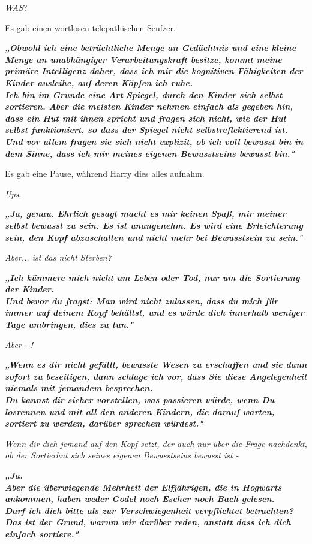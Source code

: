 {\emph{WAS}?

Es gab einen wortlosen telepathischen Seufzer.

\textbf{\emph{„Obwohl ich eine beträchtliche Menge an Gedächtnis und eine kleine Menge an unabhängiger Verarbeitungskraft besitze, kommt meine primäre Intelligenz daher, dass ich mir die kognitiven Fähigkeiten der Kinder ausleihe, auf deren Köpfen ich ruhe.\\ Ich bin im Grunde eine Art Spiegel, durch den Kinder sich selbst sortieren. Aber die meisten Kinder nehmen einfach als gegeben hin, dass ein Hut mit ihnen spricht und fragen sich nicht, wie der Hut selbst funktioniert, so dass der Spiegel nicht selbstreflektierend ist.}}\\ \textbf{\emph{\hfill\break Und vor allem fragen sie sich nicht explizit, ob ich voll bewusst bin in dem Sinne, dass ich mir meines eigenen Bewusstseins bewusst bin."}}

Es gab eine Pause, während Harry dies alles aufnahm.

\emph{Ups}.

\textbf{\emph{„Ja, genau. Ehrlich gesagt macht es mir keinen Spaß, mir meiner selbst bewusst zu sein. Es ist unangenehm. Es wird eine Erleichterung sein, den Kopf abzuschalten und nicht mehr bei Bewusstsein zu sein."}}

\emph{Aber... ist das nicht Sterben?}

\textbf{\emph{„Ich kümmere mich nicht um Leben oder Tod, nur um die Sortierung der Kinder.\\ Und bevor du fragst: Man wird nicht zulassen, dass du mich für immer auf deinem Kopf behältst, und es würde dich innerhalb weniger Tage umbringen, dies zu tun."}}

\emph{Aber - !}

\textbf{\emph{„Wenn es dir nicht gefällt, bewusste Wesen zu erschaffen und sie dann sofort zu beseitigen, dann schlage ich vor, dass Sie diese Angelegenheit niemals mit jemandem besprechen.\\ Du kannst dir sicher vorstellen, was passieren würde, wenn Du losrennen und mit all den anderen Kindern, die darauf warten, sortiert zu werden, darüber sprechen würdest."}}

\emph{Wenn dir dich jemand auf den Kopf setzt, der auch nur über die Frage nachdenkt, ob der Sortierhut sich seines eigenen Bewusstseins bewusst ist -}

\textbf{\emph{„Ja.\\ Aber die überwiegende Mehrheit der Elfjährigen, die in Hogwarts ankommen, haben weder Godel noch Escher noch Bach gelesen.\\ Darf ich dich bitte als zur Verschwiegenheit verpflichtet betrachten? Das ist der Grund, warum wir darüber reden, anstatt dass ich dich einfach sortiere."}}

}
